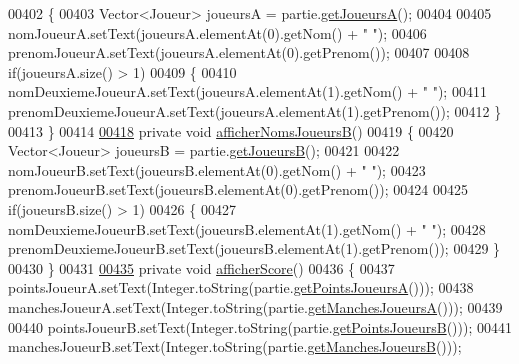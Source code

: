\begin{DoxyCode}
00402     \{
00403         Vector<Joueur> joueursA = partie.\hyperlink{classcom_1_1example_1_1area_1_1_partie_a0f944de317206d9b99f9ffc7146a43ef}{getJoueursA}();
00404 
00405         nomJoueurA.setText(joueursA.elementAt(0).getNom() + \textcolor{stringliteral}{" "});
00406         prenomJoueurA.setText(joueursA.elementAt(0).getPrenom());
00407 
00408         \textcolor{keywordflow}{if}(joueursA.size() > 1)
00409         \{
00410             nomDeuxiemeJoueurA.setText(joueursA.elementAt(1).getNom() + \textcolor{stringliteral}{" "});
00411             prenomDeuxiemeJoueurA.setText(joueursA.elementAt(1).getPrenom());
00412         \}
00413     \}
00414 
\hyperlink{classcom_1_1example_1_1area_1_1_i_h_m_gestion_partie_a55e51d83d01ea0c3c6400f6419edfd06}{00418}     \textcolor{keyword}{private} \textcolor{keywordtype}{void} \hyperlink{classcom_1_1example_1_1area_1_1_i_h_m_gestion_partie_a55e51d83d01ea0c3c6400f6419edfd06}{afficherNomsJoueursB}()
00419     \{
00420         Vector<Joueur> joueursB = partie.\hyperlink{classcom_1_1example_1_1area_1_1_partie_a3c6b981de54d03eeb553919983ee3be8}{getJoueursB}();
00421 
00422         nomJoueurB.setText(joueursB.elementAt(0).getNom() + \textcolor{stringliteral}{" "});
00423         prenomJoueurB.setText(joueursB.elementAt(0).getPrenom());
00424 
00425         \textcolor{keywordflow}{if}(joueursB.size() > 1)
00426         \{
00427             nomDeuxiemeJoueurB.setText(joueursB.elementAt(1).getNom() + \textcolor{stringliteral}{" "});
00428             prenomDeuxiemeJoueurB.setText(joueursB.elementAt(1).getPrenom());
00429         \}
00430     \}
00431 
\hyperlink{classcom_1_1example_1_1area_1_1_i_h_m_gestion_partie_a42cce9ee62fd37d687d4a194328aac70}{00435}     \textcolor{keyword}{private} \textcolor{keywordtype}{void} \hyperlink{classcom_1_1example_1_1area_1_1_i_h_m_gestion_partie_a42cce9ee62fd37d687d4a194328aac70}{afficherScore}()
00436     \{
00437         pointsJoueurA.setText(Integer.toString(partie.\hyperlink{classcom_1_1example_1_1area_1_1_partie_a5ec15306fc24648c1698ea0cdd50bf53}{getPointsJoueursA}()));
00438         manchesJoueurA.setText(Integer.toString(partie.\hyperlink{classcom_1_1example_1_1area_1_1_partie_a7c863edbbdd07ddc7f71616949823201}{getManchesJoueursA}()));
00439 
00440         pointsJoueurB.setText(Integer.toString(partie.\hyperlink{classcom_1_1example_1_1area_1_1_partie_a376bb79a67c311e1eb681387e9440bbd}{getPointsJoueursB}()));
00441         manchesJoueurB.setText(Integer.toString(partie.\hyperlink{classcom_1_1example_1_1area_1_1_partie_a706fa101c4fcad9f2ea6473b5778b55e}{getManchesJoueursB}()));

\end{DoxyCode}

